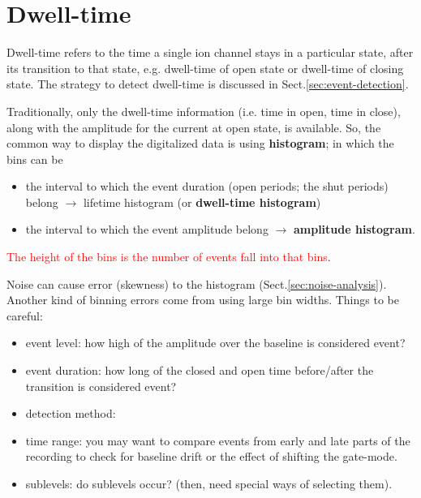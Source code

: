 \section{Dwell-time}
\label{sec:dwell-time}
\label{sec:mean-open-time}
\label{sec:mean-close-time}

Dwell-time refers to the time a single ion channel stays in a particular state,
after its transition to that state, e.g. dwell-time of open state or dwell-time
of closing state.  The strategy to detect dwell-time is discussed in
Sect.\ref{sec:event-detection}.


Traditionally, only the dwell-time information (i.e. time in open, time in
close), along with the amplitude for the current at open state, is available.
So, the common way to display the digitalized data is using {\bf histogram}; in
which the bins can be
\begin{itemize}
\item the interval to which the event duration (open periods; the shut
  periods) belong $\rightarrow$ lifetime histogram (or
  {\bf dwell-time histogram})
\item the interval to which the event amplitude belong $\rightarrow$
  {\bf amplitude histogram}.
\end{itemize}
\textcolor{red}{The height of the bins is the number of events fall
  into that bins}.

\begin{framed}
  Noise can cause error (skewness) to the histogram
  (Sect.\ref{sec:noise-analysis}). Another kind of binning errors come from
  using large bin widths. Things to be careful:
  \begin{itemize}
  \item event level: how high of the amplitude over the baseline is
    considered event?
  \item event duration: how long of the closed and open time
    before/after the transition is considered event?
  \item detection method:
  \item time range: you may want to compare events from early and late
    parts of the recording to check for baseline drift or the effect
    of shifting the gate-mode.
  \item sublevels: do sublevels occur? (then, need special ways of
    selecting them).
  \end{itemize}
\end{framed}

